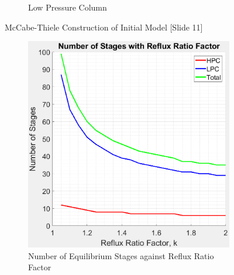 \begin{figure}[ht]
\begin{subfigure}{0.49\textwidth}
            \caption{Low Pressure Column}
            \label{fig:LPC_v0}
        \end{subfigure}
        \caption{McCabe-Thiele Construction of Initial Model [Slide 11]}
        \label{fig:mccabe_v0}
    \end{figure}
    
    \begin{figure}[ht]
        \begin{subfigure}{0.49\textwidth}
            \centering
            \includegraphics[width=\linewidth]{airseparation/handouts/graphics/graph-stages_vs_R_va.jpeg}
            \caption{Number of Equilibrium Stages against \newline Reflux Ratio Factor}
            \label{fig:stage_vs_R}
        \end{subfigure}
        \hspace*{\fill} %
        \begin{subfigure}{0.49\textwidth}
            \centering

\end{subfigure}
\end{figure}
